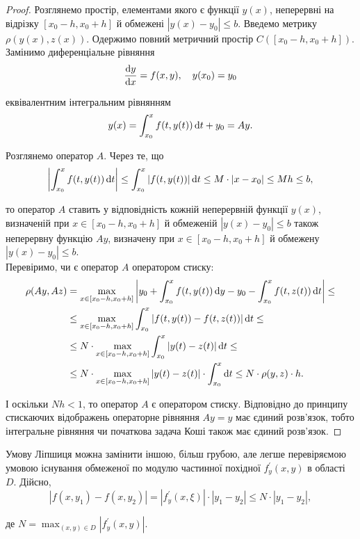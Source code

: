 \begin{proof}
	Розглянемо простір, елементами якого є функції $y(x)$, неперервні на відрізку $[x_0 - h, x_0 + h]$ й обмежені $|y(x) - y_0| \le b$. Введемо метрику $\rho(y(x), z(x))$. Одержимо повний метричний простір $C([x_0 - h, x_0 + h])$. Замінимо диференціальне рівняння
	\begin{equation*}
		\frac{\mathop{}\!\mathrm{d} y}{\mathop{}\!\mathrm{d} x} = f(x, y), \quad y(x_0) = y_0
	\end{equation*}

	еквівалентним інтегральним рівнянням
	\begin{equation*}
		y(x) = \int_{x_0}^x f(t, y(t)) \mathop{}\!\mathrm{d} t + y_0 = A y.
	\end{equation*}
	
	Розглянемо оператор $A$. Через те, що  
	\begin{equation*}
		\left|\int_{x_0}^x f(t, y(t)) \mathop{}\!\mathrm{d} t \right| \le \int_{x_0}^x |f(t, y(t))| \mathop{}\!\mathrm{d} t \le M \cdot |x-x_0| \le Mh \le b,
	\end{equation*}

	то оператор $A$ ставить у відповідність кожній неперервній функції $y(x)$, визначеній при $x\in[x_0 - h, x_0 + h]$ й обмеженій $|y(x)-y_0|\le b$ також неперервну функцію $Ay$,  визначену при $x\in[x_0 - h, x_0 + h]$ й обмежену $|y(x)-y_0|\le b$. \\

	Перевіримо, чи є оператор $A$ оператором стиску:
	\begin{align*}
		\rho(Ay, Az) &= \max_{x \in[x_0-h,x_0+h]} \left|y_0 + \int_{x_0}^x f(t, y(t)) \mathop{}\!\mathrm{d} y - y_0 - \int_{x_0}^x f(t, z(t)) \mathop{}\!\mathrm{d} t\right| \le \\
		&\le \max_{x \in[x_0-h,x_0+h]} \int_{x_0}^x |f(t, y(t)) - f(t, z(t))| \mathop{}\!\mathrm{d} t \le \\
		&\le N \cdot \max_{x \in[x_0-h,x_0+h]} \int_{x_0}^x |y(t) - z(t)| \mathop{}\!\mathrm{d} t \le \\
		&\le N \cdot \max_{x \in[x_0-h,x_0+h]} |y(t) - z(t)| \cdot \int_{x_0}^x \mathop{}\!\mathrm{d} t \le N \cdot \rho(y, z) \cdot h.
	\end{align*}

	І оскільки $Nh < 1$, то оператор $A$ є оператором стиску. Відповідно до принципу стискаючих відображень операторне рівняння $Ay=y$ має єдиний розв'язок, тобто інтегральне рівняння чи початкова задача Коші також має єдиний розв'язок.
\end{proof}

\begin{remark}
	Умову Ліпшиця можна замінити іншою, більш грубою, але легше перевіряємою умовою існування обмеженої по модулю частинної похідної $f_y^\prime (x,y)$ в області $D$. Дійсно,
	\begin{equation*}
		|f(x,y_1)-f(x,y_2)|=|f_y^\prime(x,\xi)|\cdot|y_1-y_2|\le N\cdot|y_1-y_2|,
	\end{equation*}

	де $N = \max_{(x,y)\in D} |f_y^\prime(x,y)|$.
\end{remark}


